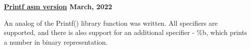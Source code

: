 \textbf{\href{https://github.com/jirol9xa/printf-on-nasm} {Printf asm version} \hfill March, 2022}\par

\begin{itemize}
	An analog of the Printf() library function was written. All specifiers are supported, and there is also support for an additional specifier - \%b, which prints a number in binary representation.
\end{itemize}\par